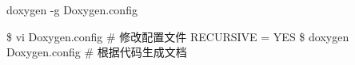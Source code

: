doxygen -\/g Doxygen.\+config

\$ vi Doxygen.\+config \# 修改配置文件 RECURSIVE = YES \$ doxygen Doxygen.\+config \# 根据代码生成文档 